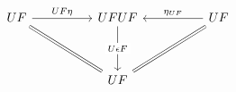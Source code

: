 \[\begin{tikzcd}
	UF && UFUF && UF \\
	\\
	&& UF
	\arrow[Rightarrow, no head, from=1-1, to=3-3]
	\arrow[Rightarrow, no head, from=1-5, to=3-3]
	\arrow["UF\eta", from=1-1, to=1-3]
	\arrow["{\eta_{UF}}"', from=1-5, to=1-3]
	\arrow["{U\epsilon F}"{description}, from=1-3, to=3-3]
\end{tikzcd}\]